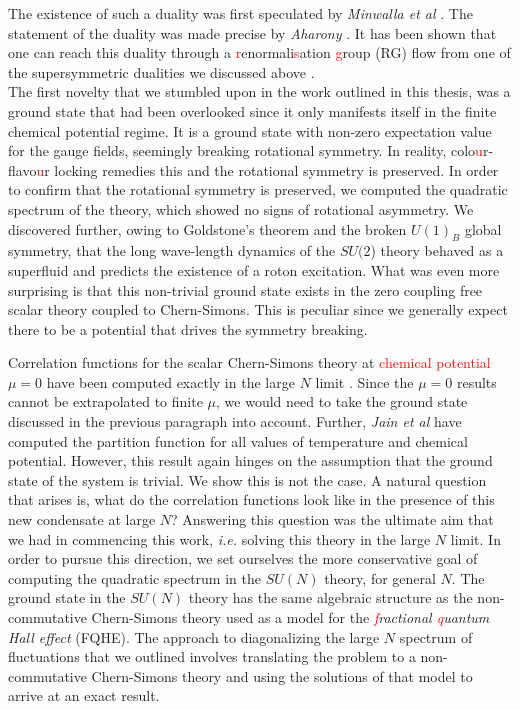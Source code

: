 The existence of such a duality was first speculated by \textit{Minwalla et al} \cite{Giombi:2011kc}. The statement of the duality was made precise by \textit{Aharony} \cite{Aharony:2015mjs}.  It has been shown that one can reach this duality through a \textcolor{red}{r}enormali\textcolor{red}{s}ation \textcolor{red}{g}roup (RG) flow from one of the supersymmetric dualities we discussed above \cite{Gur-Ari:2015pca}.\\

The first novelty that we stumbled upon in the work outlined in this thesis, was a ground state that had been overlooked since it only manifests itself in the finite chemical potential regime. It is a ground state with non-zero expectation value for the gauge fields, seemingly breaking rotational symmetry. In reality, colo\textcolor{red}{u}r-flavo\textcolor{red}{u}r locking remedies this and the rotational symmetry is preserved. In order to confirm that the rotational symmetry is preserved, we computed the quadratic spectrum of the theory, which showed no signs of rotational asymmetry. We discovered further, owing to Goldstone's theorem and the broken $U(1)_B$ global symmetry, that the long wave-length dynamics of the $SU(2$) theory behaved as a superfluid and predicts the existence of a roton excitation. What was even more surprising is that this non-trivial ground state exists in the zero coupling free scalar theory coupled to Chern-Simons. This is peculiar since we generally expect there to be a potential that drives the symmetry breaking.

Correlation functions for the scalar Chern-Simons theory at \textcolor{red}{chemical potential} $\mu=0$ have been computed exactly in the large $N$ limit \cite{Aharony:2012nh}. Since the $\mu =0$ results cannot be extrapolated to finite $\mu$, we would need to take the ground state discussed in the previous paragraph into account. Further, \textit{Jain et al} \cite{Jain:2013gza} have computed the partition function for all values of temperature and chemical potential. However, this result again hinges on the assumption that the ground state of the system is trivial. We show this is not the case. A natural question that arises is, what do the correlation functions look like in the presence of this new condensate at large $N$? Answering this question was the ultimate aim that we had in commencing this work, \textit{i.e.} solving this theory in the large $N$ limit. In order to pursue this direction, we set ourselves the more conservative goal of computing the quadratic spectrum in the $SU(N)$ theory, for general $N$. The ground state in the $SU(N)$ theory has the same algebraic structure as the non-commutative Chern-Simons theory used as a model for the \textit{\textcolor{red}{f}ractional \textcolor{red}{q}uantum Hall effect} (FQHE). The approach to diagonalizing the large $N$ spectrum of fluctuations that we outlined involves translating the problem to a non-commutative Chern-Simons theory and using the solutions of that model to arrive at an exact result.

